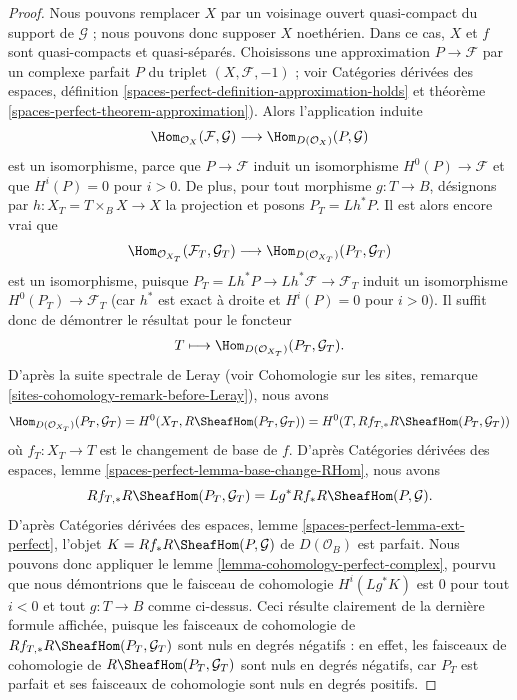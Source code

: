 \begin{proof}
Nous pouvons remplacer $X$ par un voisinage ouvert quasi-compact du support de
$\mathcal{G}$ ; nous pouvons donc supposer $X$ noethérien. Dans ce cas, $X$ et
$f$ sont quasi-compacts et quasi-séparés. Choisissons une approximation
$P \to \mathcal{F}$ par un complexe parfait $P$ du triplet
$(X, \mathcal{F}, -1)$ ; voir Catégories dérivées des espaces, définition
\ref{spaces-perfect-definition-approximation-holds} et théorème
\ref{spaces-perfect-theorem-approximation}). Alors l'application induite
$$
\Hom_{\mathcal{O}_X}(\mathcal{F}, \mathcal{G})
\longrightarrow
\Hom_{D(\mathcal{O}_X)}(P, \mathcal{G})
$$
est un isomorphisme, parce que $P \to \mathcal{F}$ induit un isomorphisme
$H^0(P) \to \mathcal{F}$ et que $H^i(P) = 0$ pour $i > 0$. De plus, pour tout
morphisme $g : T \to B$, désignons par $h : X_T = T \times_B X \to X$ la
projection et posons $P_T = Lh^*P$. Il est alors encore vrai que
$$
\Hom_{\mathcal{O}_{X_T}}(\mathcal{F}_T, \mathcal{G}_T)
\longrightarrow
\Hom_{D(\mathcal{O}_{X_T})}(P_T, \mathcal{G}_T)
$$
est un isomorphisme, puisque
$P_T = Lh^*P \to Lh^*\mathcal{F} \to \mathcal{F}_T$ induit un isomorphisme
$H^0(P_T) \to \mathcal{F}_T$ (car $h^*$ est exact à droite et
$H^i(P) = 0$ pour $i > 0$). Il suffit donc de démontrer le résultat pour le
foncteur
$$
T \longmapsto \Hom_{D(\mathcal{O}_{X_T})}(P_T, \mathcal{G}_T).
$$
D'après la suite spectrale de Leray (voir Cohomologie sur les sites, remarque
\ref{sites-cohomology-remark-before-Leray}), nous avons
$$
\Hom_{D(\mathcal{O}_{X_T})}(P_T, \mathcal{G}_T) =
H^0(X_T, R\SheafHom(P_T, \mathcal{G}_T)) =
H^0(T, Rf_{T, *}R\SheafHom(P_T, \mathcal{G}_T))
$$
où $f_T : X_T \to T$ est le changement de base de $f$. D'après Catégories
dérivées des espaces, lemme
\ref{spaces-perfect-lemma-base-change-RHom}, nous avons
$$
Rf_{T, *}R\SheafHom(P_T, \mathcal{G}_T) = Lg^*Rf_*R\SheafHom(P, \mathcal{G}).
$$
D'après Catégories dérivées des espaces, lemme
\ref{spaces-perfect-lemma-ext-perfect}, l'objet
$K = Rf_*R\SheafHom(P, \mathcal{G})$ de $D(\mathcal{O}_B)$ est parfait. Nous
pouvons donc appliquer le lemme \ref{lemma-cohomology-perfect-complex}, pourvu
que nous démontrions que le faisceau de cohomologie $H^i(Lg^*K)$ est $0$ pour
tout $i < 0$ et tout $g : T \to B$ comme ci-dessus. Ceci résulte clairement de
la dernière formule affichée, puisque les faisceaux de cohomologie de
$Rf_{T, *}R\SheafHom(P_T, \mathcal{G}_T)$ sont nuls en degrés négatifs : en
effet, les faisceaux de cohomologie de
$R\SheafHom(P_T, \mathcal{G}_T)$ sont nuls en degrés négatifs, car $P_T$ est
parfait et ses faisceaux de cohomologie sont nuls en degrés positifs.
\end{proof}

